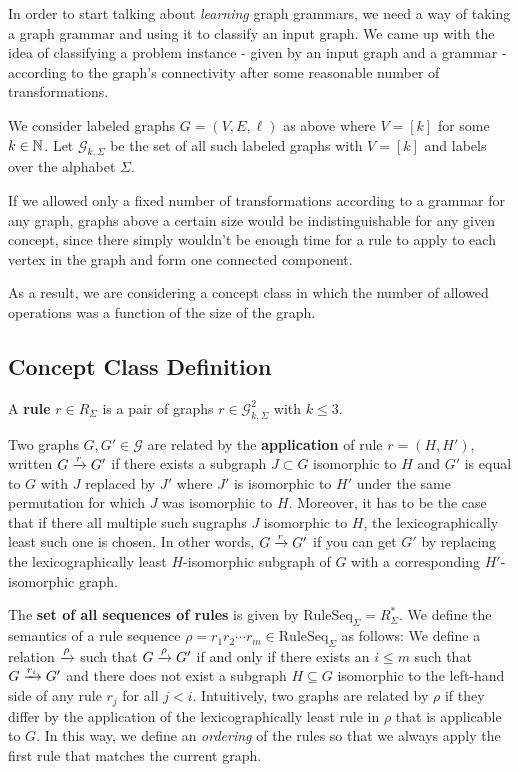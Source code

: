 \documentclass[]{article}
\def\RuleSeq{\mathrm{RuleSeq}\xspace}
\def\Graphs{\mathcal{G}\xspace}
\begin{document}
In order to start talking about \emph{learning} graph grammars, we need a way of
taking a graph grammar and using it to classify an input graph. We came up with
the idea of classifying a problem instance - given by an input graph and a
grammar - according to the graph's connectivity after some reasonable number of transformations.

We consider labeled graphs $G = (V,E,\ell)$ as above where $V = [k]$ for some
$k\in \N$. Let $\Graphs_{k,\Sigma}$ be the set of all such labeled graphs with
$V=[k]$ and labels over the alphabet $\Sigma$.

If we allowed only a fixed number of transformations according to a grammar for
any graph, graphs above a certain size would be indistinguishable for any given
concept, since there simply wouldn't be enough time for a rule to apply to each
vertex in the graph and form one connected component.

As a result, we are considering a concept class in which the number of allowed
operations was a function of the size of the graph.

\subsection{Concept Class Definition}

A \textbf{rule} $r \in R_{\Sigma}$ is a pair of graphs
$r \in \Graphs_{k,\Sigma}^2$ with $k \leq 3$.

Two graphs $G,G' \in \Graphs$ are related by the \textbf{application} of rule
$r = (H,H')$, written $G \xrightarrow{r} G'$ if there exists a subgraph $J \subset G$
isomorphic to $H$ and $G'$ is equal to $G$ with $J$ replaced by $J'$ where $J'$
is isomorphic to $H'$ under the same permutation for which $J$ was isomorphic to
$H$. Moreover, it has to be the case that if there all multiple such sugraphs
$J$ isomorphic to $H$, the lexicographically least such one is chosen.
In other words, $G \xrightarrow{r} G'$ if you can get $G'$ by replacing the
lexicographically least $H$-isomorphic subgraph of $G$ with a corresponding
$H'$-isomorphic graph.

The \textbf{set of all sequences of rules} is given by
$\RuleSeq_{\Sigma} = R_{\Sigma}^*$. We define the semantics of a rule sequence
$\rho = r_1r_2\dotsm r_m \in \RuleSeq_{\Sigma}$ as follows: We define a relation
$\xrightarrow{\rho}$ such that $G \xrightarrow{\rho} G'$ if and only if there exists an
$i\leq m$ such that $G\xrightarrow{r_i} G'$ and there does not exist a subgraph
$H \subseteq G$ isomorphic to the left-hand side of any rule $r_j$ for all
$j < i$. Intuitively, two graphs are related by $\rho$ if they differ by the
application of the lexicographically least rule in $\rho$ that is applicable to
$G$. In this way, we define an \emph{ordering} of the rules so that we always apply
the first rule that matches the current graph.
\end{document}
